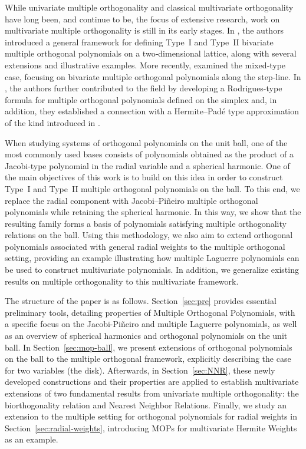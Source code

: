 \documentclass[a4paper]{article}
\theoremstyle{plain}
\theoremstyle{definition}
\begin{document}
While univariate multiple orthogonality and classical multivariate orthogonality have long been, and continue to be, the focus of extensive research, work on multivariate multiple orthogonality is still in its early stages. In \cite{FV26}, the authors introduced a general framework for defining Type~I and Type~II bivariate multiple orthogonal polynomials on a two‑dimensional lattice, along with several extensions and illustrative examples. More recently, \cite{MRW25} examined the mixed‑type case, focusing on bivariate multiple orthogonal polynomials along the step‑line. In \cite{FFV26}, the authors further contributed to the field by developing a Rodrigues-type formula for multiple orthogonal polynomials defined on the simplex and, in addition, they established a connection with a Hermite–Padé type approximation of the kind introduced in \cite{Sor02}. \medskip


When studying systems of orthogonal polynomials on the unit ball, one of the most commonly used bases consists of polynomials obtained as the product of a Jacobi‑type polynomial in the radial variable and a spherical harmonic. One of the main objectives of this work is to build on this idea in order to construct Type~I and Type~II multiple orthogonal polynomials on the ball. To this end, we replace the radial component with Jacobi–Piñeiro multiple orthogonal polynomials while retaining the spherical harmonic. In this way, we show that the resulting family forms a basis of polynomials satisfying multiple orthogonality relations on the ball. Using this methodology, we also aim to extend orthogonal polynomials associated with general radial weights to the multiple orthogonal setting, providing an example illustrating how multiple Laguerre polynomials can be used to construct multivariate polynomials. In addition, we generalize existing results on multiple orthogonality to this multivariate framework.

\medskip

The structure of the paper is as follows. Section~\ref{sec:pre} provides essential preliminary tools, detailing properties of Multiple Orthogonal Polynomials, with a specific focus on the Jacobi-Pi\~neiro and multiple Laguerre polynomials, as well as an overview of spherical harmonics and orthogonal polynomials on the unit ball. In Section~\ref{sec:mop-ball}, we present extensions of orthogonal polynomials on the ball to the multiple orthogonal framework, explicitly describing the case for two variables (the disk). Afterwards, in Section~\ref{sec:NNR}, these newly developed constructions and their properties are applied to establish multivariate extensions of two fundamental results from univariate multiple orthogonality: the biorthogonality relation and Nearest Neighbor Relations. Finally, we study an extension to the multiple setting for orthogonal polynomials for radial weights in Section~\ref{sec:radial-weights}, introducing MOPs for multivariate Hermite Weights as an example.
\end{document}
